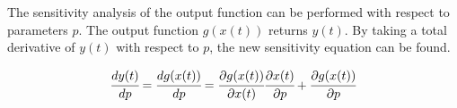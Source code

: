 \documentclass[../Article_Sensitivity_Analsysis.tex]{subfiles}
\begin{document}
	The sensitivity analysis of the output function can be performed with respect to parameters $p$. The output function $g(x(t))$ returns ${y}(t)$. By taking a total derivative of ${y}(t)$ with respect to $p$, the new sensitivity equation can be found.
	
	{\footnotesize
		\begin{equation}
			\cfrac{d {y}(t)}{dp} = \cfrac{d g(x(t))}{dp} = \cfrac{\partial g(x(t))}{\partial x(t)} \cfrac{\partial x(t)}{\partial p} + \cfrac{\partial g(x(t))}{\partial p}
	   \end{equation} }
	
\end{document}
